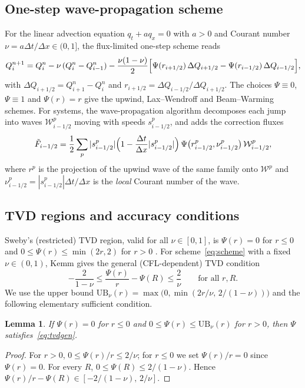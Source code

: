 \documentclass[11pt]{article}
\newcommand{\UB}{\mathrm{UB}}
\theoremstyle{plain}
\newtheorem{lemma}[theorem]{Lemma}
\theoremstyle{definition}
\begin{document}
\subsection{One-step wave-propagation scheme}
For the linear advection equation $q_t+aq_x=0$ with $a>0$ and Courant number $\nu=a\Delta t/\Delta x\in(0,1]$, the flux-limited one-step scheme reads
\begin{equation}\label{eq:scheme}
Q_i^{n+1}=Q_i^n-\nu\,(Q_i^n-Q_{i-1}^n)-\frac{\nu(1-\nu)}{2}\Bigl[\Psi(r_{i+1/2})\,\Delta Q_{i+1/2}-\Psi(r_{i-1/2})\,\Delta Q_{i-1/2}\Bigr],
\end{equation}
with $\Delta Q_{i+1/2}=Q_{i+1}^n-Q_i^n$ and $r_{i+1/2}=\Delta Q_{i-1/2}/\Delta Q_{i+1/2}$. The choices $\Psi\equiv0$, $\Psi\equiv1$ and $\Psi(r)=r$ give the upwind, Lax--Wendroff and Beam--Warming schemes. For systems, the wave-propagation algorithm \cite{LeVeque1997,LeVeque2002} decomposes each jump into waves $\mathcal{W}^p_{i-1/2}$ moving with speeds $s^p_{i-1/2}$, and adds the correction fluxes
\begin{equation}\label{eq:wavecorr}
\tilde F_{i-1/2}=\frac12\sum_p |s^p_{i-1/2}|\Bigl(1-\frac{\Delta t}{\Delta x}|s^p_{i-1/2}|\Bigr)\,\Psi\bigl(r^p_{i-1/2},\nu^p_{i-1/2}\bigr)\,\mathcal{W}^p_{i-1/2},
\end{equation}
where $r^p$ is the projection of the upwind wave of the same family onto $\mathcal{W}^p$ and $\nu^p_{i-1/2}=|s^p_{i-1/2}|\Delta t/\Delta x$ is the \emph{local} Courant number of the wave.

\subsection{TVD regions and accuracy conditions}
Sweby's (restricted) TVD region, valid for all $\nu\in[0,1]$, is $\Psi(r)=0$ for $r\le0$ and $0\le\Psi(r)\le\min(2r,2)$ for $r>0$ \cite{Sweby1984}. For scheme~\eqref{eq:scheme} with a fixed $\nu\in(0,1)$, Kemm \cite[eq.~(17)]{Kemm2011} gives the general (CFL-dependent) TVD condition
\begin{equation}\label{eq:tvdgen}
-\frac{2}{1-\nu}\le\frac{\Psi(r)}{r}-\Psi(R)\le\frac{2}{\nu}\qquad\text{for all } r,R.
\end{equation}
We use the upper bound $\UB_\nu(r)=\max\bigl(0,\min(2r/\nu,\,2/(1-\nu))\bigr)$ and the following elementary sufficient condition.

\begin{lemma}\label{lem:pointwise}
If $\Psi(r)=0$ for $r\le0$ and $0\le\Psi(r)\le\UB_\nu(r)$ for $r>0$, then $\Psi$ satisfies~\eqref{eq:tvdgen}.
\end{lemma}
\begin{proof}
For $r>0$, $0\le\Psi(r)/r\le2/\nu$; for $r\le0$ we set $\Psi(r)/r=0$ since $\Psi(r)=0$. For every $R$, $0\le\Psi(R)\le 2/(1-\nu)$. Hence $\Psi(r)/r-\Psi(R)\in[-2/(1-\nu),\,2/\nu]$.
\end{proof}
\end{document}
